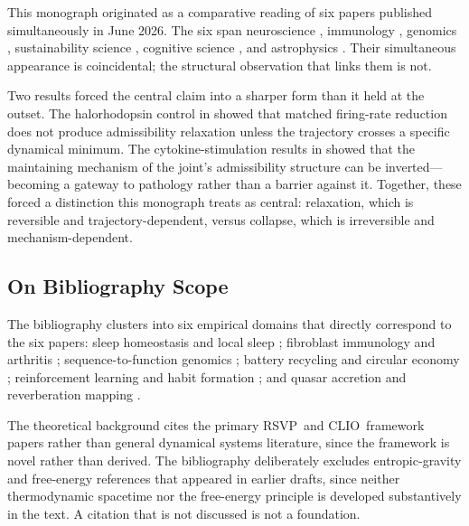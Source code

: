 \documentclass[12pt, a4paper, twoside]{book}
\theoremstyle{definition}
\theoremstyle{remark}
\newcommand{\RSVP}{\textsf{RSVP}}
\newcommand{\CLIO}{\textsf{CLIO}}
\begin{document}
This monograph originated as a comparative reading of six papers published simultaneously in June 2026. The six span neuroscience \citep{driessen2026}, immunology \citep{davidson2026}, genomics \citep{spiro2026}, sustainability science \citep{tian2026}, cognitive science \citep{okitsu2026}, and astrophysics \citep{leung2026}. Their simultaneous appearance is coincidental; the structural observation that links them is not.

Two results forced the central claim into a sharper form than it held at the outset. The halorhodopsin control in \citet{driessen2026} showed that matched firing-rate reduction does not produce admissibility relaxation unless the trajectory crosses a specific dynamical minimum. The cytokine-stimulation results in \citet{davidson2026} showed that the maintaining mechanism of the joint's admissibility structure can be inverted---becoming a gateway to pathology rather than a barrier against it. Together, these forced a distinction this monograph treats as central: relaxation, which is reversible and trajectory-dependent, versus collapse, which is irreversible and mechanism-dependent.

\subsection*{On Bibliography Scope}

The bibliography clusters into six empirical domains that directly correspond to the six papers: sleep homeostasis and local sleep \citep{tononi2014, tononi2020, vyazovskiy2009, vyazovskiy2011, huber2004, massimini2004, diering2017, devivo2017, alfonsa2023, miyamoto2016, funk2017}; fibroblast immunology and arthritis \citep{croft2019, zhang2019, buckley2019, donlin2018}; sequence-to-function genomics \citep{zhou2015, kelley2018, avsec2021, linder2025, huang2023, sasse2023, karollus2023, deboer2024}; battery recycling and circular economy \citep{harper2019, geissdoerfer2017, zhang2025, cheng2024, ciez2019}; reinforcement learning and habit formation \citep{suttonbarto2018, dayanballeine2002, keramati2011, dezfouli2014, momennejad2017, gershman2017, balleine2010}; and quasar accretion and reverberation mapping \citep{shakura1973, abramowicz1988, peterson1993, netzer2013, fausnaugh2016, cackett2020, mchardy2018, burke2021, fanetal2023}.

The theoretical background cites the primary \RSVP\ and \CLIO\ framework papers rather than general dynamical systems literature, since the framework is novel rather than derived. The bibliography deliberately excludes entropic-gravity and free-energy references that appeared in earlier drafts, since neither thermodynamic spacetime \citep{jacobson1995} nor the free-energy principle \citep{friston2010} is developed substantively in the text. A citation that is not discussed is not a foundation.
\end{document}
